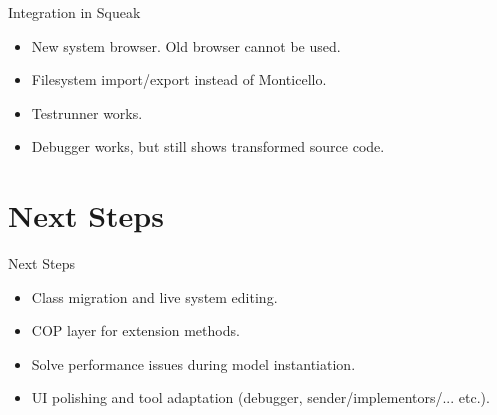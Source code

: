 \documentclass[xcolor=dvipsname, handout]{beamer} %
\begin{document}
\begin{frame}{Integration in Squeak}
\begin{itemize}
  \item New system browser. Old browser cannot be used.
  \item Filesystem import/export instead of Monticello.
  \item Testrunner works.
  \item Debugger works, but still shows transformed source code.
\end{itemize}
\end{frame}

\section{Next Steps}
\begin{frame}{Next Steps}
  \begin{itemize}
    \item Class migration and live system editing.
    \item COP layer for extension methods.
    \item Solve performance issues during model instantiation.
    \item UI polishing and tool adaptation (debugger, sender/implementors/... etc.).
  \end{itemize}
\end{frame}
\end{document}
